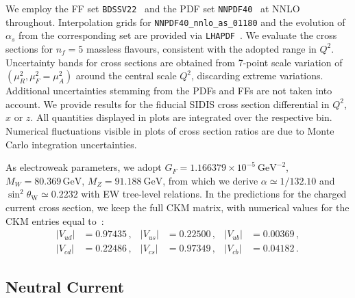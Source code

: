 \documentclass[11pt,a4paper]{article}
\newcommand{\nf}{n_f}
\def\code#1{\texttt{#1}}
\begin{document}
We employ the FF set \code{BDSSV22}~\cite{Borsa:2022vvp} and the PDF set \code{NNPDF40}~\cite{NNPDF:2021njg} at NNLO throughout.
Interpolation grids for \code{NNPDF40\_nnlo\_as\_01180} and the evolution of $\alpha_s$ from the corresponding set are provided via \code{LHAPDF}~\cite{Buckley:2014ana}.
We evaluate the cross sections for $\nf=5$ massless flavours, consistent with the adopted range in $Q^2$.
Uncertainty bands for cross sections are obtained from 7-point scale variation of $(\mu_R^2, \mu_F^2=\mu_A^2)$ around the central scale $Q^2$, discarding extreme variations.
Additional uncertainties stemming from the PDFs and FFs are not taken into account.
We provide results for the fiducial SIDIS cross section differential in $Q^2$, $x$ or $z$.
All quantities displayed in plots are integrated over the respective bin.
Numerical fluctuations visible in plots of cross section ratios are due to Monte Carlo integration uncertainties.

As electroweak parameters, we adopt $G_F = 1.166379\times 10^{-5}~\mathrm{GeV}^{-2}$, $M_W = 80.369 \, \mathrm{GeV}$, $M_Z = 91.188~\mathrm{GeV}$, from which we derive $\alpha \simeq 1/132.10$ and $\sin^2 \theta_\mathrm{W} \simeq 0.2232$ with EW tree-level relations.
In the predictions for the charged current cross section, we keep the full CKM matrix, with numerical values for the CKM entries equal to~\cite{ParticleDataGroup:2024cfk}:
\begin{align}
  |V_{ud}| &= 0.97435\,, & |V_{us}| &= 0.22500\,, & |V_{ub}| &= 0.00369\,, \nonumber \\
  |V_{cd}| &= 0.22486\,, & |V_{cs}| &= 0.97349\,, & |V_{cb}| &= 0.04182\,.
\end{align}


\subsection{Neutral Current}
\end{document}

